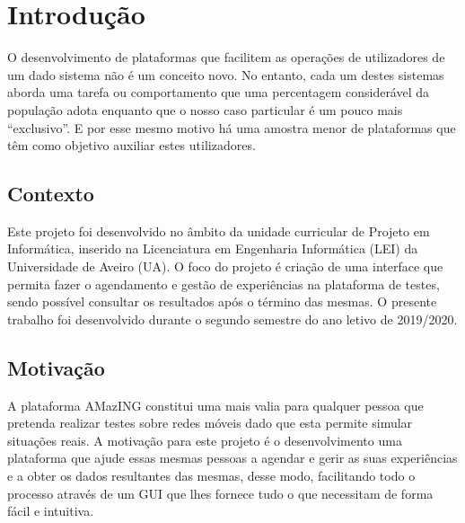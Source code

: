 \chapter{Introdução}
\label{chp:introduction}
O desenvolvimento de plataformas que facilitem as operações de utilizadores de um dado sistema não é um conceito novo.  No entanto, cada um destes sistemas aborda uma tarefa ou comportamento que uma percentagem considerável da população adota enquanto que o nosso caso particular é um pouco mais “exclusivo”. E por esse mesmo motivo há uma amostra menor de plataformas que têm como objetivo auxiliar estes utilizadores.

\section{Contexto}
Este projeto foi desenvolvido no âmbito da unidade curricular de Projeto em Informática, inserido na Licenciatura em Engenharia Informática (LEI) da Universidade de Aveiro (UA). O foco do projeto é criação de uma interface que permita fazer o agendamento e gestão de experiências na plataforma de testes, sendo possível consultar os resultados após o término das mesmas. O presente trabalho foi desenvolvido durante o segundo semestre do ano letivo de 2019/2020.

\section{Motivação}
A plataforma AMazING constitui uma mais valia para qualquer pessoa que pretenda realizar testes sobre redes móveis dado que esta permite simular situações reais.\newline
A motivação para este projeto é o desenvolvimento uma plataforma que ajude essas mesmas pessoas a agendar e gerir as suas experiências e a obter os dados resultantes das mesmas, desse modo, facilitando todo o processo através de um GUI que lhes fornece tudo o que necessitam de forma fácil e intuitiva.

